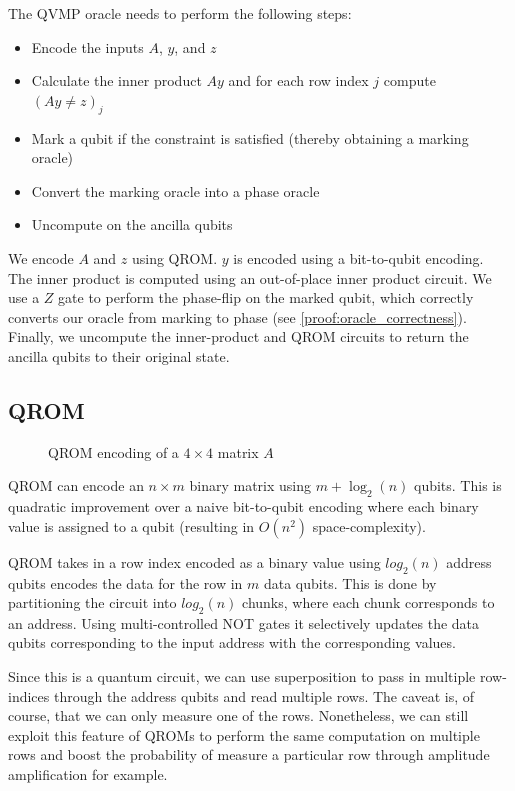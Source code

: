 \documentclass[11pt]{article}
\theoremstyle{definition}
\theoremstyle{remark}
\begin{document}
The QVMP oracle needs to perform the following steps:
\begin{itemize}[itemsep=1mm, parsep=0pt]
  \item Encode the inputs $A$, $y$, and $z$
  \item Calculate the inner product $Ay$ and for each row index $j$ compute $(Ay
    \neq z)_j$
  \item Mark a qubit if the constraint is satisfied (thereby obtaining a marking
    oracle)
  \item Convert the marking oracle into a phase oracle
  \item Uncompute on the ancilla qubits
\end{itemize}
We encode $A$ and $z$ using QROM. $y$ is encoded using a bit-to-qubit encoding.
The inner product is computed using an out-of-place inner product circuit. We
use a $Z$ gate to perform the phase-flip on the marked qubit, which correctly
converts our oracle from marking to phase (see \cref{proof:oracle_correctness}).
Finally, we uncompute the inner-product and QROM circuits to return the ancilla
qubits to their original state.

\subsection{QROM}

\begin{figure}
  \centering
  
  \caption{QROM encoding of a $4 \times 4$ matrix $A$}
  \label{fig:qrom_4x4}
\end{figure}

QROM can encode an $n \times m$ binary matrix using $m + \log_2(n)$ qubits. This
is quadratic improvement over a naive bit-to-qubit encoding where each binary
value is assigned to a qubit (resulting in $O(n^2)$ space-complexity). 

QROM takes in a row index encoded as a binary value using $log_2(n)$ address
qubits encodes the data for the row in $m$ data qubits.  This is done by
partitioning the circuit into $log_2(n)$ chunks, where each chunk corresponds to
an address. Using multi-controlled NOT gates it selectively updates the data
qubits corresponding to the input address with the corresponding values.

Since this is a quantum circuit, we can use superposition to pass in multiple
row-indices through the address qubits and read multiple rows. The caveat is, of
course, that we can only measure one of the rows. Nonetheless, we can still
exploit this feature of QROMs to perform the same computation on multiple rows
and boost the probability of measure a particular row through amplitude
amplification for example.
\end{document}
